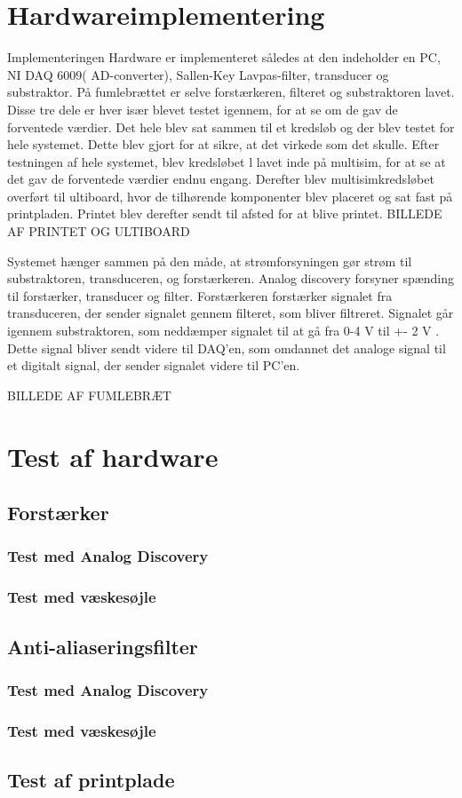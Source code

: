 \section{Hardwareimplementering}
Implementeringen
Hardware er implementeret således at den indeholder en PC, NI DAQ 6009( AD-converter), Sallen-Key Lavpas-filter, transducer og substraktor. På fumlebrættet er selve forstærkeren, filteret og substraktoren lavet. Disse tre dele er hver især blevet testet igennem, for at se om de gav de forventede værdier. Det hele blev sat sammen til et kredsløb og der blev testet for hele systemet. Dette blev gjort for at sikre, at det virkede som det skulle. Efter testningen af hele systemet, blev kredsløbet l lavet inde på multisim, for at se at det gav de forventede værdier endnu engang. Derefter blev multisimkredsløbet overført til ultiboard, hvor de tilhørende komponenter blev placeret og sat fast på printpladen.  Printet blev derefter sendt til afsted for at blive printet.
BILLEDE AF PRINTET OG ULTIBOARD

Systemet hænger sammen på den måde, at strømforsyningen gør strøm til substraktoren, transduceren,  og forstærkeren. Analog discovery forsyner spænding til forstærker, transducer og filter. Forstærkeren forstærker signalet fra transduceren, der sender signalet gennem filteret, som bliver filtreret. Signalet går igennem substraktoren, som neddæmper signalet til at gå fra 0-4 V til +- 2 V . Dette signal bliver sendt videre til DAQ’en, som omdannet det analoge signal til et digitalt signal, der sender signalet videre til PC’en. 

BILLEDE AF FUMLEBRÆT


\section{Test af hardware}
\subsection{Forstærker}

\subsubsection{Test med Analog Discovery}
\subsubsection{Test med væskesøjle}
\subsection{Anti-aliaseringsfilter}
\subsubsection{Test med Analog Discovery}
\subsubsection{Test med væskesøjle}
\subsection{Test af printplade}
